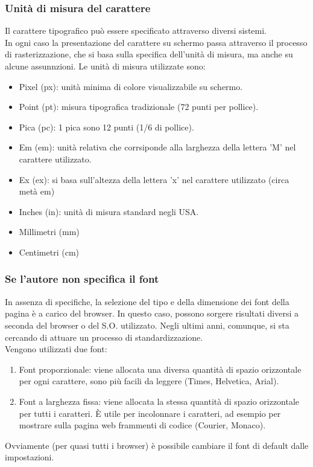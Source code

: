 \documentclass{article}
\begin{document}
\subsubsection{Unità di misura del carattere}
Il carattere tipografico può essere specificato attraverso diversi sistemi.\\
In ogni caso la presentazione del carattere su schermo passa attraverso il processo di rasterizzazione, che si basa sulla specifica dell'unità di misura, ma anche su alcune assunnzioni.
Le unità di misura utilizzate sono:
\begin{itemize}
\item Pixel (px): unità minima di colore visualizzabile su schermo.
\item Point (pt): misura tipografica tradizionale (72 punti per pollice).
\item Pica (pc): 1 pica sono 12 punti (1/6 di pollice).
\item Em (em): unità relativa che corrsiponde alla larghezza della lettera 'M' nel carattere utilizzato.
\item Ex (ex): si basa sull'altezza della lettera 'x' nel carattere utilizzato (circa metà em)
\item Inches (in): unità di misura standard negli USA.
\item Millimetri (mm)
\item Centimetri (cm)
\end{itemize}
\subsubsection{Se l'autore non specifica il font}
In assenza di specifiche, la selezione del tipo e della dimensione dei font della pagina è a carico del browser. In questo caso, possono sorgere risultati diversi a seconda del browser o del S.O. utilizzato. Negli ultimi anni, comunque, si sta cercando di attuare un processo di standardizzazione.\\
Vengono utilizzati due font:
\begin{enumerate}
\item Font proporzionale: viene allocata una diversa quantità di spazio orizzontale per ogni carattere, sono più facili da leggere (Times, Helvetica, Arial).
\item Font a larghezza fissa: viene allocata la stessa quantità di spazio orizzontale per tutti i caratteri. È utile per incolonnare i caratteri, ad esempio per mostrare sulla pagina web frammenti di codice (Courier, Monaco).
\end{enumerate}
Ovviamente (per quasi tutti i browser) è possibile cambiare il font di default dalle impostazioni.
\end{document}
